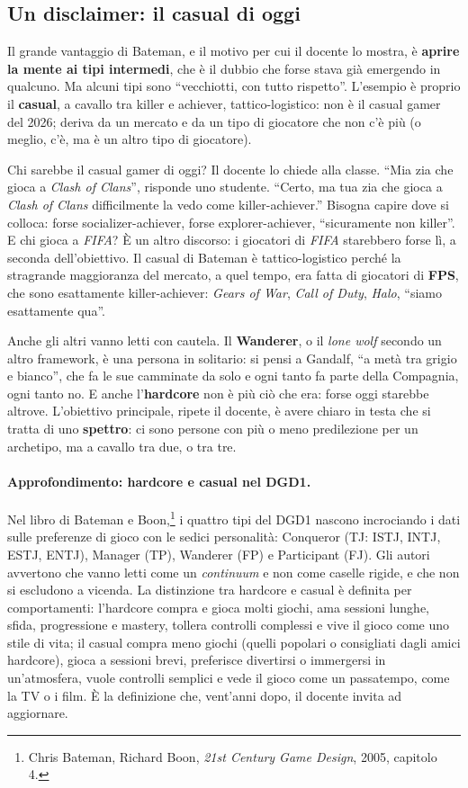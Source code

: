 \subsection{Un disclaimer: il casual di oggi}

Il grande vantaggio di Bateman, e il motivo per cui il docente lo mostra, è
\textbf{aprire la mente ai tipi intermedi}, che è il dubbio che forse stava già
emergendo in qualcuno. Ma alcuni tipi sono ``vecchiotti, con tutto rispetto''.
L'esempio è proprio il \textbf{casual}, a cavallo tra killer e achiever,
tattico-logistico: non è il casual gamer del 2026; deriva da un mercato e da un tipo
di giocatore che non c'è più (o meglio, c'è, ma è un altro tipo di giocatore).

Chi sarebbe il casual gamer di oggi? Il docente lo chiede alla classe. ``Mia zia che
gioca a \emph{Clash of Clans}'', risponde uno studente. ``Certo, ma tua zia che gioca
a \emph{Clash of Clans} difficilmente la vedo come killer-achiever.'' Bisogna capire
dove si colloca: forse socializer-achiever, forse explorer-achiever, ``sicuramente
non killer''. E chi gioca a \emph{FIFA}? È un altro discorso: i giocatori di
\emph{FIFA} starebbero forse lì, a seconda dell'obiettivo. Il casual di Bateman è
tattico-logistico perché la stragrande maggioranza del mercato, a quel tempo, era
fatta di giocatori di \textbf{FPS}, che sono esattamente killer-achiever:
\emph{Gears of War}, \emph{Call of Duty}, \emph{Halo}, ``siamo esattamente qua''.

Anche gli altri vanno letti con cautela. Il \textbf{Wanderer}, o il \emph{lone wolf}
secondo un altro framework, è una persona in solitario: si pensi a Gandalf, ``a metà
tra grigio e bianco'', che fa le sue camminate da solo e ogni tanto fa parte della
Compagnia, ogni tanto no. E anche l'\textbf{hardcore} non è più ciò che era: forse
oggi starebbe altrove. L'obiettivo principale, ripete il docente, è avere chiaro in
testa che si tratta di uno \textbf{spettro}: ci sono persone con più o meno
predilezione per un archetipo, ma a cavallo tra due, o tra tre.

\paragraph{Approfondimento: hardcore e casual nel DGD1.} Nel libro di Bateman e
Boon,\footnote{Chris Bateman, Richard Boon, \emph{21st Century Game Design}, 2005,
capitolo 4.} i quattro tipi del DGD1 nascono incrociando i dati sulle preferenze di
gioco con le sedici personalità: Conqueror (TJ: ISTJ, INTJ, ESTJ, ENTJ), Manager (TP),
Wanderer (FP) e Participant (FJ). Gli autori avvertono che vanno letti come un
\emph{continuum} e non come caselle rigide, e che non si escludono a vicenda. La
distinzione tra hardcore e casual è definita per comportamenti: l'hardcore compra e
gioca molti giochi, ama sessioni lunghe, sfida, progressione e mastery, tollera
controlli complessi e vive il gioco come uno stile di vita; il casual compra meno
giochi (quelli popolari o consigliati dagli amici hardcore), gioca a sessioni brevi,
preferisce divertirsi o immergersi in un'atmosfera, vuole controlli semplici e vede
il gioco come un passatempo, come la TV o i film. È la definizione che, vent'anni
dopo, il docente invita ad aggiornare.

